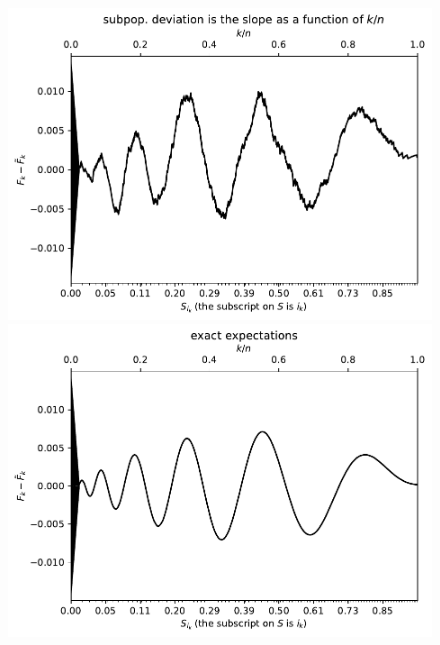 \documentclass{article}
\begin{document}
\begin{figure}
\begin{centering}

\parbox{\imsize}{\includegraphics[width=\imsize]
                {./codes/unweighted/50000_3300_10_2/cumulative.pdf}}
\quad\quad
\parbox{\imsize}{\includegraphics[width=\imsize]
                {./codes/unweighted/50000_3300_10_2/cumulative_exact.pdf}}

\vspace{\vertsep}


\end{centering}
\end{figure}
\end{document}
